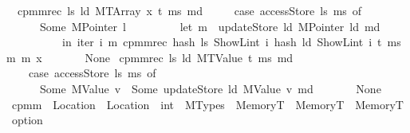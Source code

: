 \begin{isabellebody}
\isanewline
\ \ {\isachardoublequoteopen}cpm{}mrec\ l\isactrlsub s\ l\isactrlsub d\ {\isacharparenleft}{\kern0pt}MTArray\ x\ t{\isacharparenright}{\kern0pt}\ m\isactrlsub s\ m\isactrlsub d\ {\isacharequal}{\kern0pt}\isanewline
\ \ \ \ {\isacharparenleft}{\kern0pt}case\ accessStore\ l\isactrlsub s\ m\isactrlsub s\ of\isanewline
\ \ \ \ \ \ Some\ {\isacharparenleft}{\kern0pt}MPointer\ l{\isacharparenright}{\kern0pt}\ {\isasymRightarrow}\isanewline
\ \ \ \ \ \ \ \ {\isacharparenleft}{\kern0pt}let\ m\ {\isacharequal}{\kern0pt}\ updateStore\ l\isactrlsub d\ {\isacharparenleft}{\kern0pt}MPointer\ l\isactrlsub d{\isacharparenright}{\kern0pt}\ m\isactrlsub d\isanewline
\ \ \ \ \ \ \ \ \ \ in\ iter{\isacharprime}{\kern0pt}\ {\isacharparenleft}{\kern0pt}{\isasymlambda}i\ m{\isacharprime}{\kern0pt}{\isachardot}{\kern0pt}\ cpm{}mrec\ {\isacharparenleft}{\kern0pt}hash\ l\isactrlsub s\ {\isacharparenleft}{\kern0pt}ShowL\isactrlsub i\isactrlsub n\isactrlsub t\ i{\isacharparenright}{\kern0pt}{\isacharparenright}{\kern0pt}\ {\isacharparenleft}{\kern0pt}hash\ l\isactrlsub d\ {\isacharparenleft}{\kern0pt}ShowL\isactrlsub i\isactrlsub n\isactrlsub t\ i{\isacharparenright}{\kern0pt}{\isacharparenright}{\kern0pt}\ t\ m\isactrlsub s\ m{\isacharprime}{\kern0pt}{\isacharparenright}{\kern0pt}\ m\ x{\isacharparenright}{\kern0pt}\isanewline
\ \ \ \ {\isacharbar}{\kern0pt}\ {\isacharunderscore}{\kern0pt}\ {\isasymRightarrow}\ None{\isacharparenright}{\kern0pt}{\isachardoublequoteclose}\isanewline
{\isacharbar}{\kern0pt}\ {\isachardoublequoteopen}cpm{}mrec\ l\isactrlsub s\ l\isactrlsub d\ {\isacharparenleft}{\kern0pt}MTValue\ t{\isacharparenright}{\kern0pt}\ m\isactrlsub s\ m\isactrlsub d\ {\isacharequal}{\kern0pt}\isanewline
\ \ \ \ {\isacharparenleft}{\kern0pt}case\ accessStore\ l\isactrlsub s\ m\isactrlsub s\ of\isanewline
\ \ \ \ \ \ Some\ {\isacharparenleft}{\kern0pt}MValue\ v{\isacharparenright}{\kern0pt}\ {\isasymRightarrow}\ Some\ {\isacharparenleft}{\kern0pt}updateStore\ l\isactrlsub d\ {\isacharparenleft}{\kern0pt}MValue\ v{\isacharparenright}{\kern0pt}\ m\isactrlsub d{\isacharparenright}{\kern0pt}\isanewline
\ \ \ \ {\isacharbar}{\kern0pt}\ {\isacharunderscore}{\kern0pt}\ {\isasymRightarrow}\ None{\isacharparenright}{\kern0pt}{\isachardoublequoteclose}\isanewline
\isanewline
{}\isamarkupfalse%
\ cpm{}m\ {\isacharcolon}{\kern0pt}{\isacharcolon}{\kern0pt}\ {\isachardoublequoteopen}Location\ {\isasymRightarrow}\ Location\ {\isasymRightarrow}\ int\ {\isasymRightarrow}\ MTypes\ {\isasymRightarrow}\ MemoryT\ {\isasymRightarrow}\ MemoryT\ {\isasymRightarrow}\ MemoryT\ option{\isachardoublequoteclose}\isanewline

\end{isabellebody}
